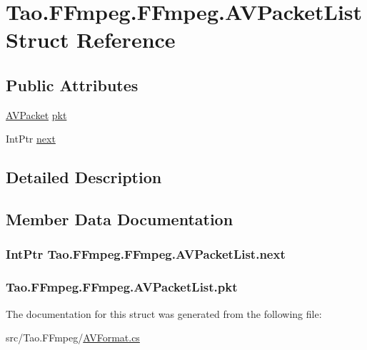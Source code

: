 \hypertarget{struct_tao_1_1_f_fmpeg_1_1_f_fmpeg_1_1_a_v_packet_list}{
\section{Tao.FFmpeg.FFmpeg.AVPacketList Struct Reference}
\label{struct_tao_1_1_f_fmpeg_1_1_f_fmpeg_1_1_a_v_packet_list}
}
\subsection*{Public Attributes}
\begin{DoxyCompactItemize}
\item 
\hyperlink{struct_tao_1_1_f_fmpeg_1_1_f_fmpeg_1_1_a_v_packet}{AVPacket} \hyperlink{struct_tao_1_1_f_fmpeg_1_1_f_fmpeg_1_1_a_v_packet_list_a50959fb49d1f7ef33c0b64ec7302373d}{pkt}
\item 
IntPtr \hyperlink{struct_tao_1_1_f_fmpeg_1_1_f_fmpeg_1_1_a_v_packet_list_adfefcd893f9511cc982313bfc41b4128}{next}
\end{DoxyCompactItemize}


\subsection{Detailed Description}


\subsection{Member Data Documentation}
\hypertarget{struct_tao_1_1_f_fmpeg_1_1_f_fmpeg_1_1_a_v_packet_list_adfefcd893f9511cc982313bfc41b4128}{
\subsubsection[{next}]{\setlength{\rightskip}{0pt plus 5cm}IntPtr {\bf Tao.FFmpeg.FFmpeg.AVPacketList.next}}}
\label{struct_tao_1_1_f_fmpeg_1_1_f_fmpeg_1_1_a_v_packet_list_adfefcd893f9511cc982313bfc41b4128}
\hypertarget{struct_tao_1_1_f_fmpeg_1_1_f_fmpeg_1_1_a_v_packet_list_a50959fb49d1f7ef33c0b64ec7302373d}{
\subsubsection[{pkt}]{ {\bf Tao.FFmpeg.FFmpeg.AVPacketList.pkt}}}
\label{struct_tao_1_1_f_fmpeg_1_1_f_fmpeg_1_1_a_v_packet_list_a50959fb49d1f7ef33c0b64ec7302373d}


The documentation for this struct was generated from the following file:\begin{DoxyCompactItemize}
\item 
src/Tao.FFmpeg/\hyperlink{_a_v_format_8cs}{AVFormat.cs}\end{DoxyCompactItemize}
